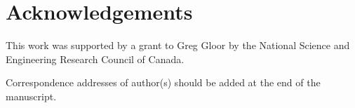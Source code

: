 \documentclass[article]{ajs}\usepackage[]{graphicx}\usepackage[]{color}
\begin{document}
\section*{Acknowledgements}
\vskip-0.25cm
This work was supported by a grant to Greg Gloor by the National Science and Engineering Research Council of Canada.  


Correspondence addresses of author(s) should be added at the end
of the manuscript. 



%

\end{document}
